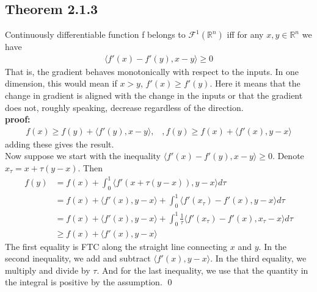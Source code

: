 \documentclass[12pt,a4paper]{article}
\begin{document}
	\subsection*{Theorem 2.1.3}\label{thm213}
	Continuously differentiable function f belongs to $\mathcal{F}^1(\mathbb{R}^n)$ iff for any $x,y \in \mathbb{R}^n$ we have
	\begin{align*}
		\langle f'(x) - f'(y), x - y \rangle \geq 0
	\end{align*}
	That is, the gradient behaves monotonically with respect to the inputs. In one dimension, this would mean  if $x > y$, $f'(x) \geq f'(y)$. Here it means that the change in gradient is aligned with the change in the inputs or that the gradient does not, roughly speaking, decrease regardless of the direction. \\
	\textbf{proof:} 
	\begin{align*}
		f(x) \geq f(y) + \langle f'(y), x - y \rangle , \hspace{10pt}, f(y) \geq f(x) + \langle f'(x), y - x \rangle
	\end{align*}
	adding these gives the result. \\
	Now suppose we start with the inequality $\langle f'(x) - f'(y), x - y \rangle \geq 0$. Denote $x_\tau = x + \tau(y - x)$. Then
	\begin{align*}
		f(y) &= f(x) + \int_{0}^{1}\langle f'(x + \tau (y - x)), y - x \rangle d\tau \\
		&= f(x) + \langle f'(x), y - x \rangle + \int_{0}^{1} \langle f'(x_\tau) - f'(x), y-x \rangle d\tau \\
		&= f(x) + \langle f'(x), y - x \rangle + \int_{0}^{1} \frac{1}{\tau}\langle f'(x_\tau) - f'(x), x_\tau - x \rangle d\tau \\
		&\geq f(x) + \langle f'(x), y-x \rangle
	\end{align*}
	The first equality is FTC along the straight line connecting $x$ and $y$. In the second inequality, we add and subtract $\langle f'(x), y - x \rangle $. In the third equality, we multiply and divide by $\tau$. And for the last inequality, we use that the quantity in the integral is positive by the assumption. \qed \\
\end{document}

